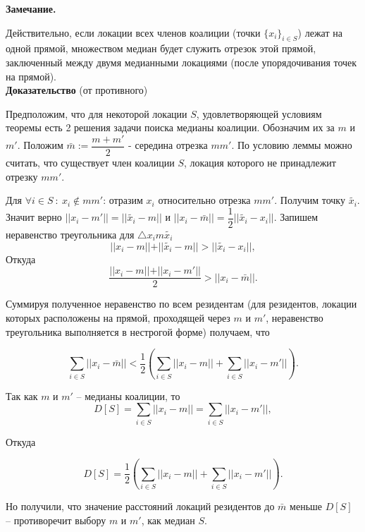 \documentclass[a4paper,12pt]{article} %
\begin{document}
 \textbf{Замечание.} \par Действительно, если локации всех членов коалиции (точки $\{x_i\}_{i \in S}$) лежат на одной прямой, множеством медиан будет служить отрезок этой прямой, заключенный между двумя медианными локациями (после упорядочивания точек на прямой). 
 \\
 
 \textbf{Доказательство} (от противного) \par
 Предположим, что для некоторой локации $S$, удовлетворяющей условиям теоремы есть 2 решения задачи поиска медианы коалиции. Обозначим их за $m$ и $m'$. Положим $\bar{m} := \dfrac{m + m'}{2}$ - середина отрезка $mm'$. По условию леммы можно считать, что существует член коалиции $S$, локация которого не принадлежит отрезку $mm'$. \par
 Для $\forall i \in S \ : \ x_i \notin mm' $: отразим   $x_i$ относительно отрезка $mm'$. Получим точку $\tilde{x_i}$. Значит верно $\vert \vert x_i - m' \vert \vert = \vert \vert \tilde{x_i} - m \vert \vert$ и $\vert \vert x_i - \bar{m} \vert \vert = \dfrac{1}{2} \vert \vert \tilde{x_i} - x_i \vert \vert$. Запишем неравенство треугольника для $\triangle x_im\tilde{x_i}$ \[ \vert \vert x_i - m \vert \vert + \vert \vert \tilde{x_i} - m \vert \vert > \vert \vert \tilde{x_i} - x_i \vert \vert , \]  Откуда \[ \dfrac{\vert \vert x_i - m \vert \vert + \vert \vert x_i - m' \vert \vert}{2} > \vert \vert x_i - \bar{m} \vert \vert . \]
	
Суммируя полученное неравенство по всем резидентам (для резидентов, локации которых расположены на прямой, проходящей через $m$ и $m'$, неравенство треугольника выполняется в нестрогой форме) получаем,  что

\[ \sum_{i \in S} \vert \vert x_i - \bar{m} \vert \vert < \dfrac{1}{2} \left( \sum_{i \in S} \vert \vert x_i - m \vert \vert + \sum_{i \in S} \vert \vert x_i - m' \vert \vert \right) . \] 

Так как $m$ и $m'$ -- медианы коалиции, то
\[ D[S] = \sum_{i \in S} \vert \vert x_i - m \vert \vert = \sum_{i \in S} \vert \vert x_i - m' \vert \vert , \]

Откуда

\[ D[S] = \dfrac{1}{2} \left( \sum_{i \in S} \vert \vert x_i - m \vert \vert + \sum_{i \in S} \vert \vert x_i - m' \vert \vert \right) . \]

Но получили, что значение расстояний локаций резидентов до $\bar{m}$ меньше $D[S]$ -- противоречит выбору $m$ и $m'$, как медиан $S$.
\end{document}
